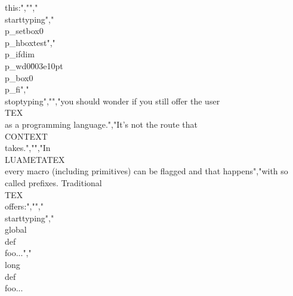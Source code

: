 this:","","\\starttyping","\\p_setbox0\\p_hbox{test}","\\p_ifdim\\p_wd0\u003e10pt \\p_box0 \\p_fi","\\stoptyping","","you should wonder if you still offer the user \\TEX\\ as a programming language.","It's not the route that \\CONTEXT\\ takes.","","In \\LUAMETATEX\\ every macro (including primitives) can be flagged and that happens","with so called prefixes. Traditional \\TEX\\ offers:","","\\starttyping","\\global\\def\\foo{...}","\\long  \\def\\foo{...} %